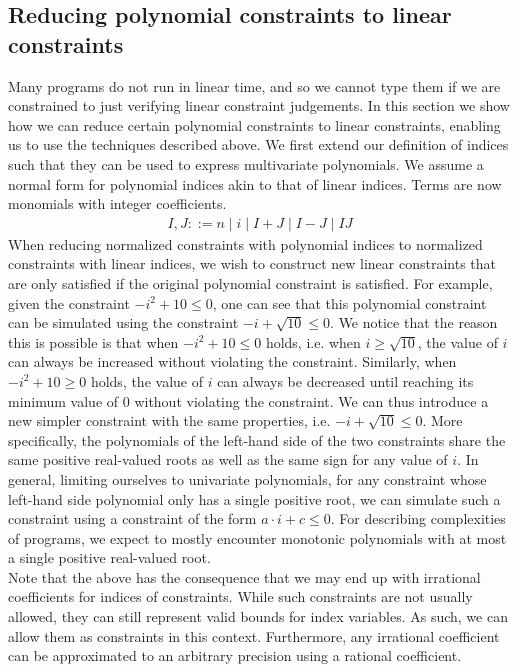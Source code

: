 \subsection{Reducing polynomial constraints to linear constraints}\label{sec:verifyingpolynomial}

Many programs do not run in linear time, and so we cannot type them if we are constrained to just verifying linear constraint judgements. In this section we show how we can reduce certain polynomial constraints to linear constraints, enabling us to use the techniques described above. We first extend our definition of indices such that they can be used to express multivariate polynomials. We assume a normal form for polynomial indices akin to that of linear indices. Terms are now monomials with integer coefficients.
%
\begin{align*}
        I,J ::= n \mid i \mid I + J \mid I - J \mid I J
\end{align*}
%
When reducing normalized constraints with polynomial indices to normalized constraints with linear indices, we wish to construct new linear constraints that are only satisfied if the original polynomial constraint is satisfied. For example, given the constraint ${-i^2 + 10 \leq 0}$, one can see that this polynomial constraint can be simulated using the constraint $-i + \sqrt{10} \leq 0$. We notice that the reason this is possible is that when ${-i^2 + 10 \leq 0}$ holds, i.e. when $i \geq \sqrt{10}$, the value of $i$ can always be increased without violating the constraint. Similarly, when ${-i^2 + 10 \geq 0}$ holds, the value of $i$ can always be decreased until reaching its minimum value of 0 without violating the constraint. We can thus introduce a new simpler constraint with the same properties, i.e. $-i + \sqrt{10} \leq 0$. More specifically, the polynomials of the left-hand side of the two constraints share the same positive real-valued roots as well as the same sign for any value of $i$. In general, limiting ourselves to univariate polynomials, for any constraint whose left-hand side polynomial only has a single positive root, we can simulate such a constraint using a constraint of the form $a \cdot i + c \leq 0$. For describing complexities of programs, we expect to mostly encounter monotonic polynomials with at most a single positive real-valued root.\\

Note that the above has the consequence that we may end up with irrational coefficients for indices of constraints. While such constraints are not usually allowed, they can still represent valid bounds for index variables. As such, we can allow them as constraints in this context. Furthermore, any irrational coefficient can be approximated to an arbitrary precision using a rational coefficient.\\

